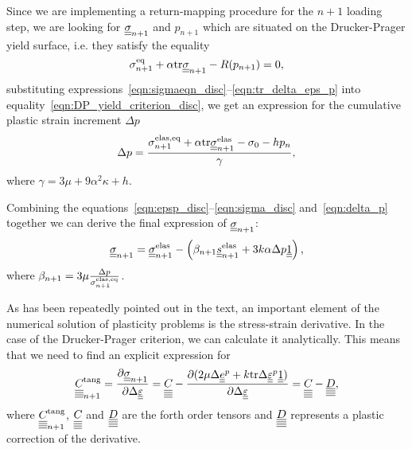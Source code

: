 \documentclass[12pt]{article}
\begin{document}
\begin{appendices}
    Since we are implementing a return-mapping procedure for the $n + 1$ loading step, we are looking for $\underline{\underline{\sigma}}_{n+1}$ and $p_{n+1}$ which are situated on the Drucker-Prager yield surface, i.e. they satisfy the equality 
    \begin{equation}\label{eqn:DP_yield_criterion_disc}
        \sigma_{n+1}^\text{eq} + \alpha \mathrm{tr} \underline{\underline{\sigma}}_{n+1} - R(p_{n+1}) = 0,
    \end{equation}
    substituting expressions~\eqref{eqn:sigmaeqn_disc}--\eqref{eqn:tr_delta_eps_p} into equality~\eqref{eqn:DP_yield_criterion_disc}, we get an expression for the cumulative plastic strain increment $\Delta p$
    \begin{equation}\label{eqn:delta_p}
        \Delta p = \frac{ \sigma_{n+1}^\text{elas,eq} + \alpha \mathrm{tr} \underline{\underline{\sigma}}_{n+1}^{\text{elas}} - \sigma_0 - h p_n}{ \gamma },
    \end{equation}
    where $\gamma = 3\mu + 9\alpha^2\kappa + h$.
    
    Combining the equations~\eqref{eqn:epsp_disc}--\eqref{eqn:sigma_disc} and~\eqref{eqn:delta_p} together we can derive the final expression of $\underline{\underline{\sigma}}_{n+1}$:
    \begin{equation}
        \underline{\underline{\sigma}}_{n+1} = \underline{\underline{\sigma}}_{n+1}^\text{elas} - \left( \beta_{n+1} \underline{\underline{s}}_{n+1}^\text{elas} + 3k\alpha \Delta p \underline{\underline{1}} \right),
    \end{equation}
    where $\beta_{n+1} = 3\mu\frac{\Delta p}{\sigma_{n+1}^\text{elas,eq}}$.

    As has been repeatedly pointed out in the text, an important element of the numerical solution of plasticity problems is the stress-strain derivative. In the case of the Drucker-Prager criterion, we can calculate it analytically. This means that we need to find an explicit expression for 
    \begin{equation*}
        \underline{\underline{\underline{\underline{C_{}}}}}^\text{tang}_{n+1} = \frac{\partial\underline{\underline{\sigma}}_{n+1}}{\partial \Delta\underline{\underline{\varepsilon}}} = \underline{\underline{\underline{\underline{C_{}}}}} - \frac{\partial (2\mu\Delta\underline{\underline{e}}^p + k\mathrm{tr}\Delta\underline{\underline{\varepsilon}}^p\underline{\underline{1}})}{\partial\Delta\underline{\underline{\varepsilon}}} = \underline{\underline{\underline{\underline{C_{}}}}} - \underline{\underline{\underline{\underline{D}}}},
    \end{equation*}
    where $\underline{\underline{\underline{\underline{C_{}}}}}^\text{tang}_{n+1}$, $\underline{\underline{\underline{\underline{C_{}}}}}$ and $\underline{\underline{\underline{\underline{D}}}}$ are the forth order tensors and $\underline{\underline{\underline{\underline{D}}}}$ represents a plastic correction of the derivative.
    

\end{appendices}
\end{document}
